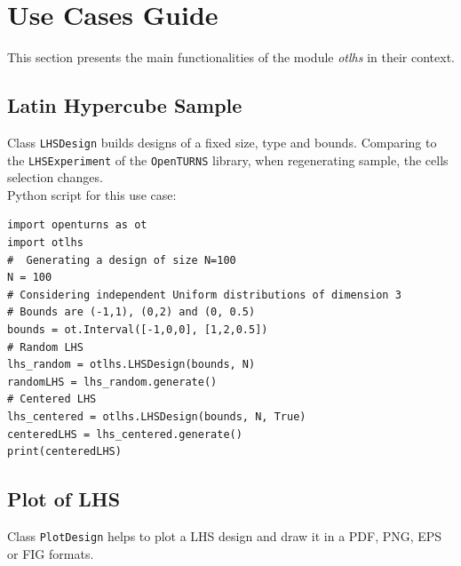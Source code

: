 %

\section{Use Cases Guide}

This section presents the main functionalities of the module \textit{otlhs} in their context.\\

\subsection{Latin Hypercube Sample}

Class \texttt{LHSDesign} builds designs of a fixed size, type and bounds. Comparing to the \texttt{LHSExperiment} of the \texttt{OpenTURNS} library, when regenerating sample, the cells selection changes.\\

Python script for this use case:

\begin{lstlisting}
import openturns as ot
import otlhs
#  Generating a design of size N=100
N = 100
# Considering independent Uniform distributions of dimension 3
# Bounds are (-1,1), (0,2) and (0, 0.5)
bounds = ot.Interval([-1,0,0], [1,2,0.5])
# Random LHS
lhs_random = otlhs.LHSDesign(bounds, N)
randomLHS = lhs_random.generate()
# Centered LHS
lhs_centered = otlhs.LHSDesign(bounds, N, True)
centeredLHS = lhs_centered.generate()
print(centeredLHS)
\end{lstlisting}

\subsection{Plot of LHS}

Class \texttt{PlotDesign} helps to plot a LHS design and draw it in a PDF, PNG, EPS or FIG formats.\\

